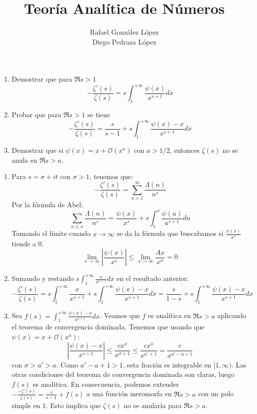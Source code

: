 \documentclass[twoside]{article}
\begin{document}
\title{Teoría Analítica de Números}
\author{Rafael González López\\Diego Pedraza López}
\maketitle

\begin{ejercicio}{1}
\begin{enumerate}
	\item Demostrar que para $\Re s > 1$
	\[ -\frac{ζ'(s)}{ζ(s)} = s \int_1^{+∞} \frac{ψ(x)}{x^{s+1}} dx \]
	\item Probar que para $\Re s > 1$ se tiene
	\[ -\frac{ζ'(s)}{ζ(s)} = \frac{s}{s-1} + s \int_1^{+∞} \frac{ψ(x)-x}{x^{s+1}}dx \]
	\item Demostrar que si $ψ(x) = x + \mathcal{O}(x^a)$ con $a > 1/2$, entonces $ζ(s)$ no se anula en $\Re s > a$.
\end{enumerate}
\end{ejercicio}
\begin{solucion}
\begin{enumerate}
	\item Para $s=σ+it$ con $σ>1$, tenemos que:
\[ - \frac{ζ'(s)}{ζ(s)} = \sum_{n=1}^{∞} \frac{Λ(n)}{n^s} \]
Por la fórmula de Abel:
\[ \sum_{n≤x} \frac{Λ(n)}{n^s} = \frac{ψ(x)}{x^s} + s \int_1^{x} \frac{ψ(u)}{u^{s+1}} du \]
Tomando el límite cuando $x\to∞$ se da la fórmula que buscabamos si $\frac{ψ(x)}{x^s}$ tiende a $0$.
\[ \lim_{x \to ∞} \left|\frac{ψ(x)}{x^s}\right| ≤ \lim_{x \to ∞} \frac{Ax}{x^σ} = 0\]
	\item Sumando y restando $s\int_1^{+∞} \frac{x}{x^{s+1}}dx$ en el resultado anterior:
	\[ -\frac{ζ'(s)}{ζ(s)} = s\int_1^{+∞} \frac{x}{x^{s+1}} + s \int_1^{+∞} \frac{ψ(x)-x}{x^{s+1}} dx = \frac{s}{1-s} + s \int_1^{+∞} \frac{ψ(x)-x}{x^{s+1}} dx \]
	\item Sea $f(s) = \int_1^{+∞} \frac{ψ(x)-x}{x^{s+1}} dx$. Veamos que $f$ es analítica en $\Re s > a$ aplicando el teorema de convergencia dominada. Tenemos que usando que $ψ(x) = x+\mathcal{O}(x^a)$:
	\[ \left|\frac{ψ(x)-x}{x^{s+1}}\right| ≤ \frac{cx^a}{x^{σ+1}} ≤ \frac{cx^a}{x^{a'+1}} = \frac{c}{x^{a'-a+1}} \]
	con $σ > a' > a$. Como $a'-a+1 > 1$, esta fración es integrable en $[1,∞)$. Las otras condiciones del teorema de convergencia dominada son claras, luego $f(s)$ es analítica. En consecuencia, podemos extender $-\frac{-ζ'(s)}{ζ(s)} = \frac{s}{s-1}+f(s)$ a una función meromorfa en $\Re s > a$ con un polo simple en $1$.
	Esto implica que $ζ(s)$ no se anularía para $\Re s > a$.
\end{enumerate}
\end{solucion}
\end{document}
